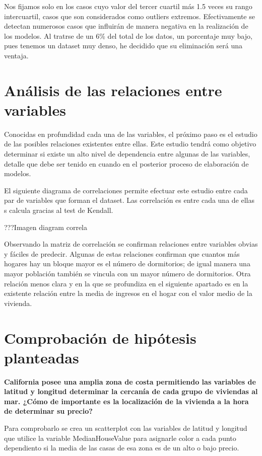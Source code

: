 {Nos fijamos solo en los casos cuyo valor del tercer cuartil más 1.5 veces su rango intercuartil, casos que son considerados como outliers extremos. Efectivamente se detectan numerosos casos que influirán de manera negativa en la realización de los modelos. Al tratrse de un 6\% del total de los datos, un porcentaje muy bajo, pues tenemos un dataset muy denso, he decidido que su eliminación será una ventaja.





\section{Análisis de las relaciones entre variables}
Conocidas en profundidad cada una de las variables, el próximo paso es el estudio de las posibles relaciones existentes entre ellas. Este estudio tendrá como objetivo determinar si existe un alto nivel de dependencia entre algunas de las variables, detalle que debe ser tenido en cuando en el posterior proceso de elaboración de modelos.

El siguiente diagrama de correlaciones permite efectuar este estudio entre cada par de variables que forman el dataset. Las correlación es entre cada una de ellas s calcula gracias al test de Kendall.

???Imagen diagram correla

Observando la matriz de correlación se confirman relaciones entre variables obvias y fáciles de predecir. Algunas de estas relaciones confirman que cuantos más hogares hay un bloque mayor es el número de dormitorios; de igual manera una mayor población también se vincula con un mayor número de dormitorios. Otra relación menos clara y en la que se profundiza en el siguiente apartado es en la existente relación entre la media de ingresos en el hogar con el valor medio de la vivienda.


\section{Comprobación de hipótesis planteadas}
\textbf{California posee una amplia zona de costa permitiendo las variables de latitud y longitud determinar la cercanía de cada grupo de viviendas al mar. ¿Cómo de importante es la localización de la vivienda a la hora de determinar su precio?}

Para comprobarlo se crea un scatterplot con las variables de latitud y longitud que utilice la variable MedianHouseValue para asignarle color a cada punto dependiento si la media de las casas de esa zona es de un alto o bajo precio. 

}
